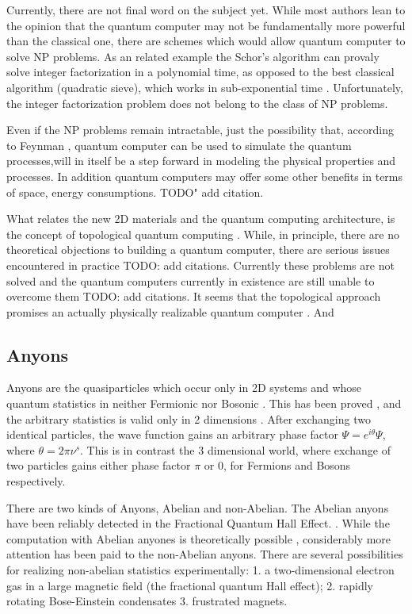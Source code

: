 Currently, there are not final word on the subject yet. While most authors lean to the opinion that the quantum computer may not be fundamentally more powerful than the classical one, there are schemes \cite{NLQC} which would allow quantum computer to solve NP problems. As an related example the Schor's algorithm \cite{Schor} can provaly solve integer factorization in a polynomial time, as opposed to the best classical algorithm (quadratic sieve), which works in sub-exponential time \cite{Pomerance}. Unfortunately, the integer factorization problem does not belong to the class of NP problems. 

Even if the NP problems remain intractable, just the possibility that, according to Feynman \cite{FQC}, quantum computer can be used to simulate the quantum processes,will in itself be a step forward in modeling the physical properties and processes. In addition quantum computers may offer some other benefits in terms of space, energy consumptions. TODO" add citation.

What relates the new 2D materials and the quantum computing architecture, is the concept of topological quantum computing \cite{Tqc1}.  While, in principle, there are no theoretical objections to building a quantum computer, there are serious issues encountered in practice TODO: add citations. Currently these problems are not solved and the quantum computers currently in existence are still unable to overcome them TODO: add citations.
It seems that the topological approach promises an actually physically realizable quantum computer \cite{Tqc2,Tqc3}. And 


\subsection*{Anyons}

Anyons are the quasiparticles which occur only in 2D systems and whose quantum statistics in neither Fermionic nor Bosonic \cite{Anyons1}.  This has been proved  \cite{Anyons2}, and the arbitrary statistics is valid only in 2 dimensions \cite{Walsh}. After exchanging two identical particles, the wave function gains an arbitrary phase factor $ \Psi = e^{i\theta}\Psi $, where $ \theta = 2\pi\nu^{s} $. This is in contrast the 3 dimensional world, where exchange of two particles gains either phase factor $ \pi $ or $ 0 $, for Fermions and Bosons respectively.

There are two kinds of Anyons, Abelian and non-Abelian. The Abelian anyons have been reliably detected in the Fractional Quantum Hall Effect. \cite{FQHE}.  While the computation with Abelian anyones is theoretically possible \cite{AbelianAnyons}, considerably more attention has been paid to the non-Abelian anyons.
There are several possibilities for realizing non-abelian statistics experimentally: 1. a two-dimensional electron gas in a large magnetic field (the fractional quantum Hall effect); 2. rapidly rotating Bose-Einstein condensates 3. frustrated magnets.

